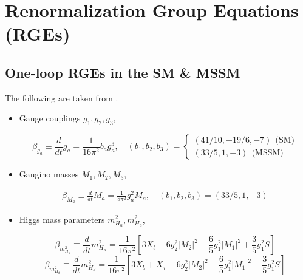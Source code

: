 \chapter{Renormalization Group Equations (RGEs)}
\label{app:RGEs}

\section{One-loop RGEs in the SM \& MSSM}
\label{app:onelooprge}

The following are taken from \cite{RN75}.

\begin{itemize}
\item Gauge couplings $g_1,g_2,g_3$,

\begin{fleqn}
\begin{equation}
\beta_{g_a}\equiv \frac{d}{dt}g_{a}=\frac{1}{16\pi^2}b_{a}g^3_{a},\quad (b_1,b_2,b_3)=\left\{
                \begin{array}{ll}
                  (41/10,-19/6,-7)~~ \text{(SM)}\\
                  (33/5,1,-3)~~ \text{(MSSM)}
                \end{array}
                \right.
\end{equation}
\end{fleqn}

\item Gaugino masses $M_1,M_2,M_3$,

\begin{fleqn}
\begin{align}
\beta_{M_a} \equiv \frac{d}{dt}M_a=\frac{1}{8\pi^2}g^2_{a}M_a,\quad (b_1,b_2,b_3)=(33/5,1,-3)
\end{align}
\end{fleqn}

\item Higgs mass parameters $m^2_{H_u},m^2_{H_d}$,

\begin{fleqn}
\begin{equation}
\beta_{m^2_{H_u}} \equiv \frac{d}{dt}m^2_{H_u}=\frac{1}{16\pi^2}\left[3X_t-6g^2_2|M_2|^2-\frac{6}{5}g^2_1|M_1|^2+\frac{3}{5}g^2_1S\right]
\end{equation}
\begin{equation}
\beta_{m^2_{H_d}} \equiv \frac{d}{dt}m^2_{H_d}=\frac{1}{16\pi^2}\left[3X_b+X_{\tau}-6g^2_2|M_2|^2-\frac{6}{5}g^2_1|M_1|^2-\frac{3}{5}g_1^2S\right]
\end{equation}
\end{fleqn}


\end{itemize}
